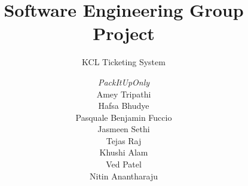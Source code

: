 \documentclass[a4paper, 12pt]{report}
\title{Software Engineering Group Project}
\subtitle{KCL Ticketing System}%
\author{\textit{PackItUpOnly}\\   %
Amey Tripathi\\                        %
Hafsa Bhudye\\                        %
Pasquale Benjamin Fuccio\\           %
Jasmeen Sethi\\                       %
Tejas Raj\\                       %
Khushi Alam\\                        %
Ved Patel\\                        %
Nitin Anantharaju                      %
}
\begin{document}
    \maketitle
    \romantableofcontents

    
    
    
    
    
    

    \appendix
\end{document}
